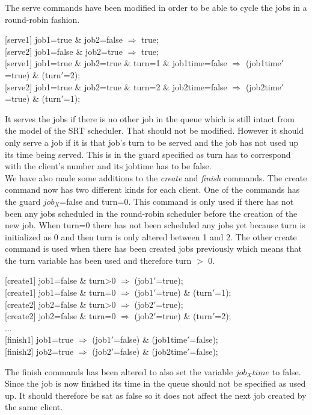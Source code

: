 \documentclass[12pt]{report}
\begin{document}
The serve commands have been modified in order to be able to cycle the jobs in a round-robin fashion.
\begin{center}
{[serve1]} job1=true \& job2=false $\Rightarrow$ true;\\
{[serve2]} job1=false \& job2=true $\Rightarrow$ true;\\
{[serve1]} job1=true \& job2=true \& turn=1 \& job1time=false $\Rightarrow$ (job1time$'$=true) \& (turn$'$=2);\\
{[serve2]} job1=true \& job2=true \& turn=2 \& job2time=false $\Rightarrow$ (job2time$'$=true) \& (turn$'$=1);
\end{center}
It serves the jobs if there is no other job in the queue which is still intact from the model of the SRT scheduler. That should not be modified. However it should only serve a job if it is that job's turn to be served and the job has not used up its time being served. This is in the guard specified as turn has to correspond with the client's number and its jobtime has to be false.\\
We have also made some additions to the \emph{create} and \emph{finish} commands. The create command now has two different kinds for each client. One of the commands has the guard $job_X$=false and turn=0. This command is only used if there has not been any jobs scheduled in the round-robin scheduler before the creation of the new job. When turn=0 there has not been scheduled any jobs yet because turn is initialized as 0 and then turn is only altered between 1 and 2. The other create command is used when there has been created jobs previously which means that the turn variable has been used and therefore turn $>$ 0.
\begin{center}
{[create1]} job1=false \& turn>0 $\Rightarrow$ (job$1'$=true);\\
{[create1]} job1=false \& turn=0 $\Rightarrow$ (job$1'$=true) \& (turn$'$=1);\\
{[create2]} job2=false \& turn>0 $\Rightarrow$ (job$2'$=true);\\
{[create2]} job2=false \& turn=0 $\Rightarrow$ (job$2'$=true) \& (turn$'$=2);\\
$\dots$\\
{[finish1]} job1=true $\Rightarrow$ (job$1'$=false) \& (job1time$'$=false);\\
{[finish2]} job2=true $\Rightarrow$ (job$2'$=false) \& (job2time$'$=false);
\end{center}
The finish commands has been altered to also set the variable $job_Xtime$ to false. Since the job is now finished its time in the queue should not be specified as used up. It should therefore be sat as false so it does not affect the next job created by the same client.\\
\end{document}

